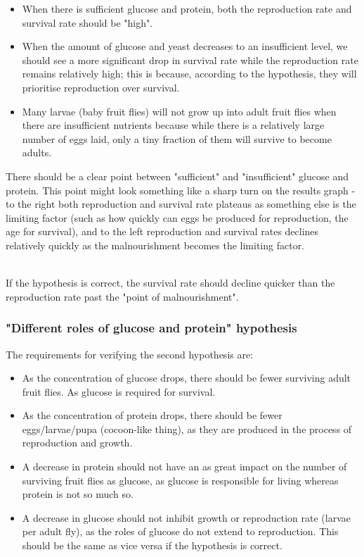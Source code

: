 \documentclass{article}
\begin{document}
\begin{itemize}
    \item When there is sufficient glucose and protein, both the reproduction rate and survival rate should be "high".
    \item When the amount of glucose and yeast decreases to an insufficient level, we should see a more significant drop in survival rate while the reproduction rate remains relatively high; this is because, according to the hypothesis, they will prioritise reproduction over survival.
    \item Many larvae (baby fruit flies) will not grow up into adult fruit flies when there are insufficient nutrients because while there is a relatively large number of eggs laid, only a tiny fraction of them will survive to become adults.
\end{itemize}

\noindent
There should be a clear point between "sufficient" and "insufficient" glucose and protein. This point might look something like a sharp turn on the results graph - to the right both reproduction and survival rate plateaus as something else is the limiting factor (such as how quickly can eggs be produced for reproduction, the age for survival), and to the left reproduction and survival rates declines relatively quickly as the malnourishment becomes the limiting factor.

\noindent\\
If the hypothesis is correct, the survival rate should decline quicker than the reproduction rate past the "point of malnourishment".

\subsubsection{"Different roles of glucose and protein" hypothesis}

\noindent
The requirements for verifying the second hypothesis are:

\begin{itemize}
    \item As the concentration of glucose drops, there should be fewer surviving adult fruit flies. As glucose is required for survival.
    \item As the concentration of protein drops, there should be fewer eggs/larvae/pupa (cocoon-like thing), as they are produced in the process of reproduction and growth.
    \item A decrease in protein should not have an as great impact on the number of surviving fruit flies as glucose, as glucose is responsible for living whereas protein is not so much so.
    \item A decrease in glucose should not inhibit growth or reproduction rate (larvae per adult fly), as the roles of glucose do not extend to reproduction. This should be the same as vice versa if the hypothesis is correct.
\end{itemize}
\end{document}
